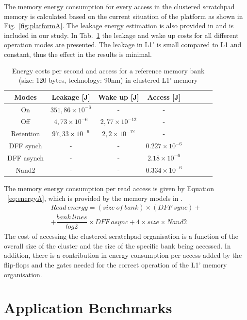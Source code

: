 The memory energy consumption for every access in the clustered scratchpad memory is calculated based on the current situation of the platform as shown in Fig.~\ref{fig:platformA}. The leakage energy estimation is also provided in \cite{Artes2011} and is included in our study. In Tab.~\ref{tab:leakage} the leakage and wake up costs for all different operation modes are presented. The leakage in L1' is small compared to L1 and constant, thus the effect in the results is minimal.

\begin{table}[!t]
\centering
\caption{Energy costs per second and access for a reference memory bank (size: 120 bytes, technology: 90nm) in clustered L1' memory }
\label{tab:leakage}
\begin{tabular}{|c|c|c|c|c|c|c|c|}
\hline 
Modes & Leakage [J] & Wake up [J] & Access [J]\\ 
\hline 
On & $351,86 \times 10 ^{-6}$ & - & -  \\ 
\hline 
Off & $ 4,73 \times 10 ^{-6}$ & $ 2,77 \times 10 ^{-12}$ & -\\ 
\hline 
Retention & $ 97,33 \times 10 ^{-6}$ & $ 2,2 \times 10 ^{-12}$ & -\\ 
\hline 
DFF synch & - & - & $ 0.227 \times 10 ^{-6}$\\ 
\hline
DFF asynch & - & - & $ 2.18 \times 10 ^{-6}$\\ 
\hline 
Nand2 & - & - & $ 0.334 \times 10 ^{-6}$\\ 
\hline
\end{tabular}      
\end{table}

The memory energy consumption per read access is given by Equation ~\ref{eq:energyA}, which is provided by the memory models in \cite{Artes2011}.    
\begin{multline}
Read \: energy = (size \: of \: bank) \times (DFF \: sync)+ \\ + \dfrac{bank \: lines}{log2} \times DFF \: async + 4 \times size \times Nand2 
\label{eq:energyA}
\end{multline}
The cost of accessing the clustered scratchpad organisation is a function of the overall size of the cluster and the size of the specific bank being accessed. In addition, there is a contribution in energy consumption per access added by the flip-flops and the gates needed for the correct operation of the L1' memory organisation.
 
\section{Application Benchmarks}
\label{sec:applications}

